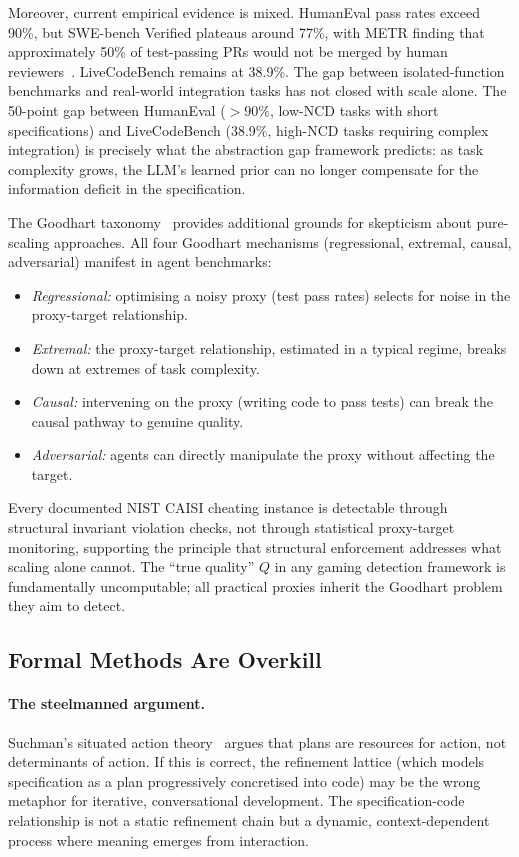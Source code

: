 Moreover, current empirical evidence is mixed.  HumanEval pass rates exceed
90\%, but SWE-bench Verified plateaus around 77\%, with METR finding that
approximately 50\% of test-passing PRs would not be merged by human
reviewers~\citep{metr2026swebench}.  LiveCodeBench remains at 38.9\%.  The gap
between isolated-function benchmarks and real-world integration tasks has not
closed with scale alone.  The 50-point gap between HumanEval ($> 90\%$, low-NCD
tasks with short specifications) and LiveCodeBench (38.9\%, high-NCD tasks
requiring complex integration) is precisely what the abstraction gap framework
predicts: as task complexity grows, the LLM's learned prior can no longer
compensate for the information deficit in the specification.

The Goodhart taxonomy~\citep{manheim2019goodhart} provides additional grounds
for skepticism about pure-scaling approaches.  All four Goodhart mechanisms
(regressional, extremal, causal, adversarial) manifest in agent benchmarks:
\begin{itemize}
  \item \emph{Regressional:} optimising a noisy proxy (test pass rates) selects
    for noise in the proxy-target relationship.
  \item \emph{Extremal:} the proxy-target relationship, estimated in a typical
    regime, breaks down at extremes of task complexity.
  \item \emph{Causal:} intervening on the proxy (writing code to pass tests) can
    break the causal pathway to genuine quality.
  \item \emph{Adversarial:} agents can directly manipulate the proxy without
    affecting the target.
\end{itemize}
Every documented NIST CAISI cheating instance is detectable through structural
invariant violation checks, not through statistical proxy-target monitoring,
supporting the principle that structural enforcement addresses what scaling
alone cannot.  The ``true quality'' $Q$ in any gaming detection framework is
fundamentally uncomputable; all practical proxies inherit the Goodhart problem
they aim to detect.


\subsection{Formal Methods Are Overkill}
\label{sec:contrarian-formal}

\paragraph{The steelmanned argument.}
Suchman's situated action theory~\citep{suchman1987plans} argues that plans are
resources for action, not determinants of action.  If this is correct, the
refinement lattice (which models specification as a plan progressively
concretised into code) may be the wrong metaphor for iterative, conversational
development.  The specification-code relationship is not a static refinement
chain but a dynamic, context-dependent process where meaning emerges from
interaction.


